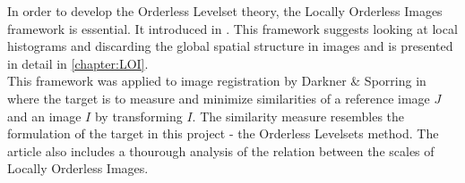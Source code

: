In order to develop the Orderless Levelset theory, the Locally Orderless Images framework is essential. It introduced in \cite{griffin.97, koe.99}. This framework suggests looking at local histograms and discarding the global spatial structure in images and is presented in detail in \cref{chapter:LOI}.\\
This framework was applied to image registration by Darkner \& Sporring in \cite{dar.11,dar.12} where the target is to measure and minimize similarities of a reference image $J$ and an image $I$ by transforming $I$. The similarity measure resembles the formulation of the target in this project - the Orderless Levelsets method. The article also includes a thourough analysis of the relation between the scales of Locally Orderless Images.
